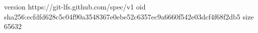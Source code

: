 version https://git-lfs.github.com/spec/v1
oid sha256:ecfdfd628c5c04f90a3548367e0ebe52c6357ec9a6660f542e03dcf4f68f2db5
size 65632
